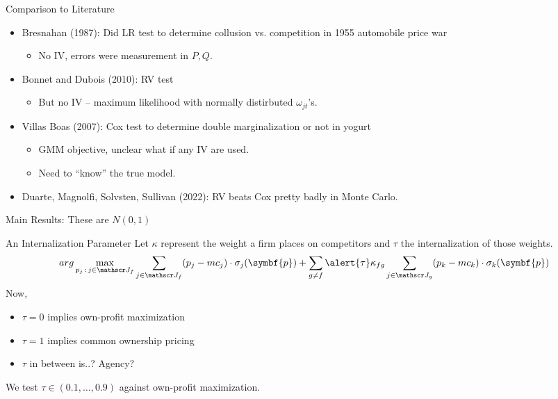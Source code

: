 \documentclass[aspectratio=169,10pt]{beamer}
\begin{document}
\begin{frame}{Comparison to Literature}
\begin{itemize}
\item Bresnahan (1987): Did LR test to determine collusion vs. competition in 1955 automobile price war
\begin{itemize}
\item No IV, errors were measurement in $P,Q$.
\end{itemize}
\item Bonnet and Dubois (2010): RV test
\begin{itemize}
\item But no IV -- maximum likelihood with normally distirbuted $\omega_{jt}$'s.
\end{itemize}
\item Villas Boas (2007): Cox test to determine double marginalization or not in yogurt
\begin{itemize}
\item GMM objective, unclear what if any IV are used.
\item Need to ``know'' the true model.
\end{itemize}
\item Duarte, Magnolfi, Solvsten, Sullivan (2022): RV beats Cox pretty badly in Monte Carlo.
\end{itemize}
\end{frame}




\begin{frame}[plain,label=mainresults]{Main Results: These are $N(0,1)$}
\begin{center}
\scalebox{0.55}{}
\end{center}
\end{frame}

\begin{frame}[plain]{An Internalization Parameter}
Let $\kappa$ represent the weight a firm places on competitors and $\tau$ the internalization of those weights.
 \begin{equation*}
 arg\max_{p_j \,:\, j \in \calJ_f} \sum_{j \in \calJ_f} (p_j - mc_j) \cdot \sigma_j(\symbf{p})+
 \sum_{g\neq f} \alert{\tau} \kappa_{fg} \sum_{j \in \calJ_g} (p_k - mc_k) \cdot \sigma_k(\symbf{p})
 \end{equation*}
Now, 
\begin{itemize}
\item $\tau = 0$ implies own-profit maximization
\item $\tau = 1$ implies common ownership pricing
\item $\tau$ in between is..? Agency?
\end{itemize}
We test $\tau \in (0.1, \ldots, 0.9)$ against own-profit maximization.
\end{frame}
\end{document}
